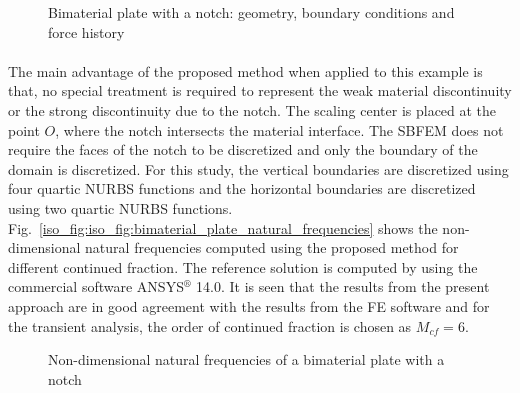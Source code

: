 \begin{figure}[h!]
\begin{subfigure}[b]{0.5\linewidth}
{            }
        \end{subfigure}
        \caption{Bimaterial plate with a notch: geometry, boundary conditions and force history}
        \label{iso_fig:bimaterial_plate_geo_bc}
    \end{figure}

\paragraph{}
The main advantage of the proposed method when applied to this example is that, no special treatment is required to represent the weak material discontinuity or the strong discontinuity due to the notch.
The scaling center is placed at the point $O$, where the notch intersects the material interface.
The SBFEM does not require the faces of the notch to be discretized and only the boundary of the domain is discretized.
For this study, the vertical boundaries are discretized using four quartic NURBS functions and the horizontal boundaries are discretized using two quartic
NURBS functions.
Fig.~\ref{iso_fig:iso_fig:bimaterial_plate_natural_frequencies} shows the non-dimensional natural frequencies computed using the proposed method for different continued fraction. The reference solution is computed by using the commercial software ANSYS$^\circledR$ 14.0.
It is seen that the results from the present approach are in good agreement with the results from the FE software and for the transient analysis, the order of continued fraction is chosen as $M_{cf} = 6$.
    \begin{figure}[h!]
        \centering
        \label{iso_fig:bimaterial_plate_natural_frequencies}
        \caption{Non-dimensional natural frequencies of a bimaterial plate with a notch}        
    \end{figure}

